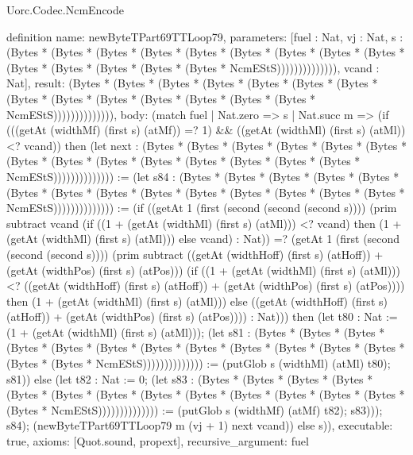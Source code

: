 \begin{lexlean}{Uorc.Codec.NcmEncode}
\begin{semanticmodule}
definition{
  name: newByteTPart69TTLoop79,
  parameters: [fuel : Nat, vj : Nat, s : (Bytes * (Bytes * (Bytes * (Bytes * (Bytes * (Bytes * (Bytes * (Bytes * (Bytes * (Bytes * (Bytes * (Bytes * (Bytes * (Bytes * NcmEStS)))))))))))))), vcand : Nat],
  result: (Bytes * (Bytes * (Bytes * (Bytes * (Bytes * (Bytes * (Bytes * (Bytes * (Bytes * (Bytes * (Bytes * (Bytes * (Bytes * (Bytes * NcmEStS)))))))))))))),
  body: (match fuel
    | Nat.zero => s
    | Nat.succ m => (if (((getAt (widthMf) (first s) (atMf)) =? 1) && ((getAt (widthMl) (first s) (atMl)) <? vcand)) then (let next : (Bytes * (Bytes * (Bytes * (Bytes * (Bytes * (Bytes * (Bytes * (Bytes * (Bytes * (Bytes * (Bytes * (Bytes * (Bytes * (Bytes * NcmEStS)))))))))))))) := (let s84 : (Bytes * (Bytes * (Bytes * (Bytes * (Bytes * (Bytes * (Bytes * (Bytes * (Bytes * (Bytes * (Bytes * (Bytes * (Bytes * (Bytes * NcmEStS)))))))))))))) := (if ((getAt 1 (first (second (second (second s)))) (prim subtract vcand (if ((1 + (getAt (widthMl) (first s) (atMl))) <? vcand) then (1 + (getAt (widthMl) (first s) (atMl))) else vcand) : Nat)) =? (getAt 1 (first (second (second (second s)))) (prim subtract ((getAt (widthHoff) (first s) (atHoff)) + (getAt (widthPos) (first s) (atPos))) (if ((1 + (getAt (widthMl) (first s) (atMl))) <? ((getAt (widthHoff) (first s) (atHoff)) + (getAt (widthPos) (first s) (atPos)))) then (1 + (getAt (widthMl) (first s) (atMl))) else ((getAt (widthHoff) (first s) (atHoff)) + (getAt (widthPos) (first s) (atPos)))) : Nat))) then (let t80 : Nat := (1 + (getAt (widthMl) (first s) (atMl))); (let s81 : (Bytes * (Bytes * (Bytes * (Bytes * (Bytes * (Bytes * (Bytes * (Bytes * (Bytes * (Bytes * (Bytes * (Bytes * (Bytes * (Bytes * NcmEStS)))))))))))))) := (putGlob s (widthMl) (atMl) t80); s81)) else (let t82 : Nat := 0; (let s83 : (Bytes * (Bytes * (Bytes * (Bytes * (Bytes * (Bytes * (Bytes * (Bytes * (Bytes * (Bytes * (Bytes * (Bytes * (Bytes * (Bytes * NcmEStS)))))))))))))) := (putGlob s (widthMf) (atMf) t82); s83))); s84); (newByteTPart69TTLoop79 m (vj + 1) next vcand)) else s)),
  executable: true,
  axioms: [Quot.sound, propext],
  recursive_argument: fuel
}


\end{semanticmodule}
\end{lexlean}

